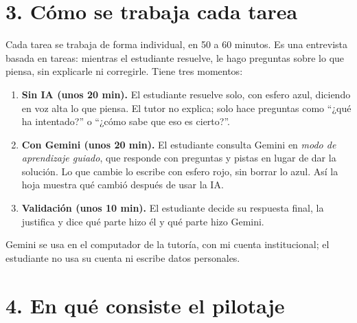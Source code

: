 \documentclass[11pt,letterpaper]{article}
\begin{document}
\section*{3. Cómo se trabaja cada tarea}

Cada tarea se trabaja de forma individual, en 50 a 60 minutos. Es una entrevista basada en tareas: mientras el estudiante resuelve, le hago preguntas sobre lo que piensa, sin explicarle ni corregirle. Tiene tres momentos:

\begin{enumerate}
  \item \textbf{Sin IA (unos 20 min).} El estudiante resuelve solo, con esfero azul, diciendo en voz alta lo que piensa. El tutor no explica; solo hace preguntas como ``¿qué ha intentado?'' o ``¿cómo sabe que eso es cierto?''.
  \item \textbf{Con Gemini (unos 20 min).} El estudiante consulta Gemini en \emph{modo de aprendizaje guiado}, que responde con preguntas y pistas en lugar de dar la solución. Lo que cambie lo escribe con esfero rojo, sin borrar lo azul. Así la hoja muestra qué cambió después de usar la IA.
  \item \textbf{Validación (unos 10 min).} El estudiante decide su respuesta final, la justifica y dice qué parte hizo él y qué parte hizo Gemini.
\end{enumerate}

Gemini se usa en el computador de la tutoría, con mi cuenta institucional; el estudiante no usa su cuenta ni escribe datos personales.

\section*{4. En qué consiste el pilotaje}
\end{document}
